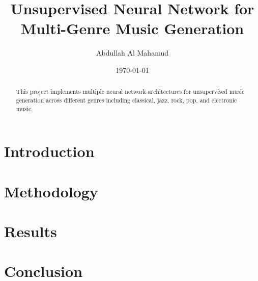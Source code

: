 \documentclass[12pt]{article}
\title{Unsupervised Neural Network for Multi-Genre Music Generation}
\author{Abdullah Al Mahamud}
\date{\today}
\begin{document}
\maketitle

\begin{abstract}
This project implements multiple neural network architectures for unsupervised music generation across different genres including classical, jazz, rock, pop, and electronic music.
\end{abstract}

\section{Introduction}

\section{Methodology}

\section{Results}

\section{Conclusion}



\end{document}
